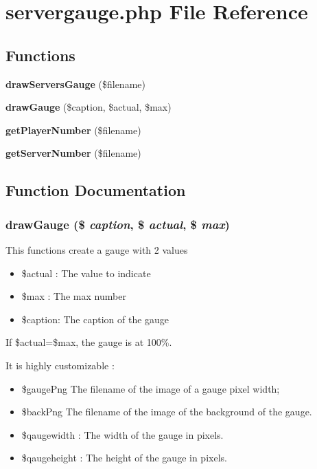 \section{servergauge.php File Reference}
\label{servergauge_8php}


\subsection*{Functions}
\begin{CompactItemize}
\item 
{\bf draw\-Servers\-Gauge} (\$filename)
\item 
{\bf draw\-Gauge} (\$caption, \$actual, \$max)
\item 
{\bf get\-Player\-Number} (\$filename)
\item 
{\bf get\-Server\-Number} (\$filename)
\end{CompactItemize}


\subsection{Function Documentation}
\subsubsection{\setlength{\rightskip}{0pt plus 5cm}draw\-Gauge (\$ {\em caption}, \$ {\em actual}, \$ {\em max})}\label{servergauge_8php_3c04d1c808721c741013f290fdf6a501}


This functions create a gauge with 2 values\begin{itemize}
\item \$actual : The value to indicate\item \$max : The max number\item \$caption: The caption of the gauge\end{itemize}


If \$actual=\$max, the gauge is at 100\%.

It is highly customizable :\begin{itemize}
\item \$gauge\-Png The filename of the image of a gauge pixel width;\item \$back\-Png The filename of the image of the background of the gauge.\item \$qaugewidth : The width of the gauge in pixels.\item \$qaugeheight : The height of the gauge in pixels. \end{itemize}
